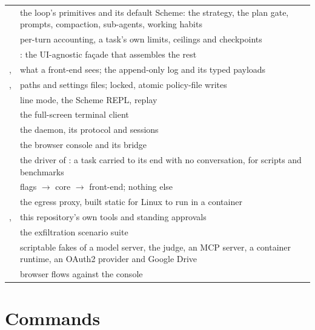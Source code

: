 {\begin{longtable}{@{}L{4.8cm}L{10.2cm}@{}}
 & the loop's primitives and its default Scheme: the strategy, the plan gate, prompts, compaction, sub-agents, working habits \\
 & per-turn accounting, a task's own limits, ceilings and checkpoints \\
 & : the UI-agnostic fa\c{c}ade that assembles the rest \\
,  & what a front-end sees; the append-only log and its typed payloads \\
,  & paths and settings files; locked, atomic policy-file writes \\
 & line mode, the Scheme REPL, replay \\
 & the full-screen terminal client \\
 & the daemon, its protocol and sessions \\
 & the browser console and its bridge \\
 & the driver of : a task carried to its end with no conversation, for scripts and benchmarks \\
 & flags $\to$ core $\to$ front-end; nothing else \\
 & the egress proxy, built static for Linux to run in a container \\
,  & this repository's own tools and standing approvals \\
 & the exfiltration scenario suite \\
 & scriptable fakes of a model server, the judge, an MCP server, a container runtime, an OAuth2 provider and Google Drive \\
 & browser flows against the console \\
\bottomrule
\end{longtable}}

\section{Commands}

